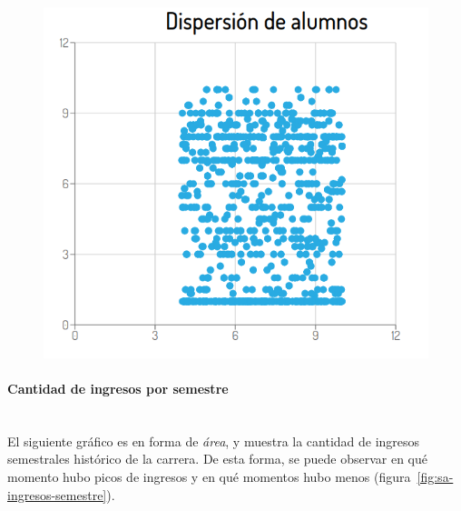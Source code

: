 \begin{figure}[H]
  \centering
    \includegraphics[scale=0.4]{images/seguimiento-academico/sa-dispersion.png}
  \label{fig:sa-dispersion}
\end{figure}

\paragraph{Cantidad de ingresos por semestre} \mbox{}\\
El siguiente gráfico es en forma de \textit{área}, y muestra la cantidad de ingresos semestrales histórico de la carrera. De esta forma, se puede observar en qué momento hubo picos de ingresos y en qué momentos hubo menos (figura~\ref{fig:sa-ingresos-semestre}).

